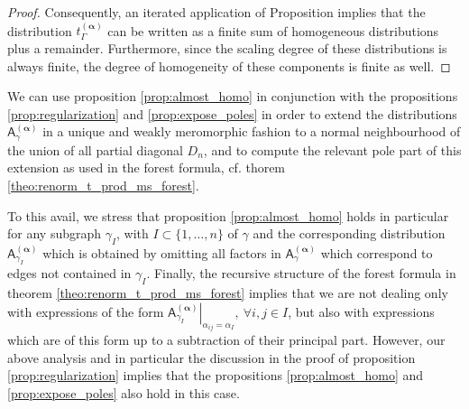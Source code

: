 \documentclass[11pt]{book}
\newcommand{\alphabd}{\boldsymbol{\alpha}}
\newcommand{\Asf}{\mathsf{A}}
\theoremstyle{break}
\begin{document}
{\begin{proof}
Consequently, an iterated application of Proposition %
implies that the distribution $t_\Gamma^{(\alphabd)}$ can be written as a finite sum of homogeneous distributions plus a remainder. Furthermore, since the scaling degree of these distributions is always finite, the degree of homogeneity of these components is finite as well. 
\end{proof}
}


We can use proposition \ref{prop:almost_homo} in conjunction with the propositions \ref{prop:regularization} and \ref{prop:expose_poles} in order to extend the distributions $\Asf_\gamma^{(\alphabd)}$ in a unique and weakly meromorphic fashion to a normal neighbourhood of the union of all partial diagonal $D_n$, and to compute the relevant pole part of this extension as used in the forest formula, cf. thorem \ref{theo:renorm_t_prod_ms_forest}. 


To this avail, we stress that proposition \ref{prop:almost_homo} holds in particular for any subgraph $\gamma_I$, with $I\subset\{1,\dots,n\}$ of $\gamma$ and the corresponding distribution $\Asf_{\gamma_I}^{(\alphabd)}$ which is obtained by omitting all factors in $\Asf_{\gamma}^{(\alphabd)}$ which correspond to edges not contained in $\gamma_I$. Finally, the recursive structure of the forest formula in theorem \ref{theo:renorm_t_prod_ms_forest} implies that we are not dealing only with 
expressions of the form $\left.\Asf_{\gamma_I}^{(\alphabd)}\right|_{\alpha_{ij}=\alpha_I}, \  \forall i,j\in I$, but also with expressions which are of this form up to a subtraction of their principal part. However, our above analysis and in particular the discussion in the proof of proposition \ref{prop:regularization} implies that the propositions \ref{prop:almost_homo} and \ref{prop:expose_poles} also hold in this case.
\end{document}
